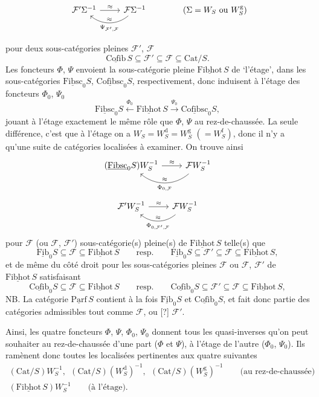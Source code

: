 \documentclass[11pt]{article}
\newcommand{\printedpage}[1]{\marginpar{\footnotesize p.~#1}}
\newcommand{\msp}[1]{\marginpar{\footnotesize [#1]}}
\newcommand{\usl}[1]{\underline{\mathrm{#1}}}
\begin{document}
\printedpage{49}

\[
\begin{tikzcd}
\mathcal{F}'\Sigma^{-1} \arrow[r, "\approx"] & \mathcal{F}\Sigma^{-1} \arrow[l, bend left=40, "\approx"', "\Psi_{\mathcal{F}',\mathcal{F}}"]
\end{tikzcd}
\qquad\qquad (\Sigma = W_S \text{ ou } W_S^{\mathrm{g}})
\]

pour deux sous-catégories pleines $\mathcal{F}'$, $\mathcal{F}$
\[
\usl{Cofib}\,S \subseteq \mathcal{F}' \subseteq \mathcal{F} \subseteq \mathrm{Cat}/S.
\]
Les foncteurs $\Phi$, $\Psi$ envoient la sous-catégorie pleine $\usl{Fibhot}\,S$ de ‘l’étage’, dans les sous-catégories $\usl{Fibsc}_0S$, $\usl{Cofibsc}_0S$, respectivement, donc induisent à l’étage des foncteurs $\Phi_0$, $\Psi_0$
\[
\usl{Fibsc}_0S \xleftarrow{\Phi_0} \usl{Fibhot}\,S \xrightarrow{\Psi_0} \usl{Cofibsc}_0S,
\]
jouant à l’étage exactement le même rôle que $\Phi$, $\Psi$ au rez-de-chaussée. La seule différence, c’est que à l’étage on a $W_S = W_S^{\mathrm{d}} = W_S^{\mathrm{g}}$ $(= W_S^{\mathrm{f}})$,
\msp{page 78}
donc il n’y a qu’une suite de catégories localisées à examiner. On trouve ainsi
\[
\begin{tikzcd}
(\usl{Fibsc}_0S)W_S^{-1} \arrow[r, "\approx"] & \mathcal{F}W_S^{-1} \arrow[l, bend left=40, "\approx"', "\Phi_{0,\mathcal{F}}"]
\end{tikzcd}
\]
\[
\begin{tikzcd}
\mathcal{F}'W_S^{-1} \arrow[r, "\approx"] & \mathcal{F}W_S^{-1} \arrow[l, bend left=40, "\approx"', "\Phi_{0,\mathcal{F}',\mathcal{F}}"]
\end{tikzcd}
\]
pour $\mathcal{F}$ (ou $\mathcal{F}$, $\mathcal{F}'$) sous-catégorie(s) pleine(s) de $\usl{Fibhot}\,S$ telle(s) que
\[
\usl{Fib}_0S \subseteq \mathcal{F} \subseteq \usl{Fibhot}\,S \qquad\text{resp.}\qquad \usl{Fib}_0S \subseteq \mathcal{F}' \subseteq \mathcal{F} \subseteq \usl{Fibhot}\,S,
\]
et de même du côté droit pour les sous-catégories pleines $\mathcal{F}$ ou $\mathcal{F}$, $\mathcal{F}'$ de $\usl{Fibhot}\,S$ satisfaisant
\[
\usl{Cofib}_0S \subseteq \mathcal{F} \subseteq \usl{Fibhot}\,S \qquad\text{resp.}\qquad \usl{Cofib}_0S \subseteq \mathcal{F}' \subseteq \mathcal{F} \subseteq \usl{Fibhot}\,S,
\]
NB. La catégorie $\usl{Parf}\,S$ contient à la fois $\usl{Fib}_0S$ et $\usl{Cofib}_0S$, et fait donc partie des catégories admissibles tout comme $\mathcal{F}$, ou [?] $\mathcal{F}'$.

Ainsi, les quatre foncteurs $\Phi$, $\Psi$, $\Phi_0$, $\Psi_0$ donnent tous les quasi-inverses qu’on peut souhaiter au rez-de-chaussée d’une part ($\Phi$ et $\Psi$), à l’étage de l’autre ($\Phi_0$, $\Psi_0$). Ils ramènent donc toutes les localisées pertinentes aux quatre suivantes
\[
\begin{gathered}
(\mathrm{Cat}/S)W_S^{-1},\ \ (\mathrm{Cat}/S)(W_S^{\mathrm{d}})^{-1},\ \ (\mathrm{Cat}/S)(W_S^{\mathrm{g}})^{-1} \qquad \text{(au rez-de-chaussée)}\\
(\usl{Fibhot}\,S)W_S^{-1} \qquad \text{(à l’étage).}
\end{gathered}
\]
\end{document}
